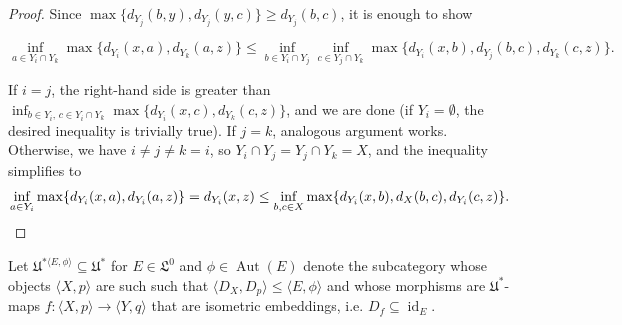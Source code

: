 \documentclass[oneside,notitlepage,12pt]{article}
\theoremstyle{definition}
\theoremstyle{remark}
\newcommand \seq [1]{\langle #1 \rangle}
\newcommand \maps {\colon} %
\newcommand \id [1]{{\operatorname{id}_{#1}}}
\newcommand \Lin {\mathfrak{L}}
\newcommand \Ult {\mathfrak{U}}
\newcommand \Aut {\operatorname{Aut}}
\let \aut \Aut
\begin{document}
\begin{proof}
    Since $\max\{d_{Y_j}(b, y) , d_{Y_j}(y, c)\} \geq d_{Y_j}(b, c)$, it is enough to show
    
     \[
        \inf_{a \in Y_i \cap Y_k} \max\{d_{Y_i}(x, a) , d_{Y_k}(a, z)\}
        \leq
        \inf_{b \in Y_i \cap Y_j} \inf_{c \in Y_j \cap Y_k} \max\{d_{Y_i}(x, b) , d_{Y_j}(b, c) , d_{Y_k}(c, z)\}.
    \]
    
    If $i = j$, the right-hand side is greater than $\inf_{b \in Y_i,\, c \in Y_i \cap Y_k} \max\{d_{Y_i}(x, c) , d_{Y_k}(c, z)\}$, and we are done (if $Y_i = \emptyset$, the desired inequality is trivially true).
    If $j = k$, analogous argument works.
    Otherwise, we have $i \neq j \neq k = i$, so $Y_i \cap Y_j = Y_j \cap Y_k = X$, and the inequality simplifies to
     \[
        \inf_{a \in Y_i} \max\{d_{Y_i}(x, a) , d_{Y_i}(a, z)\}
        = d_{Y_i}(x, z) \leq
        \inf_{b, c \in X} \max\{d_{Y_i}(x, b) , d_{X}(b, c) , d_{Y_i}(c, z)\}.
        \qedhere
    \]
\end{proof}

Let $\Ult^{*\seq{E, \phi}} \subseteq \Ult^*$ for $E \in \Lin^0$ and $\phi \in \aut(E)$ denote the subcategory whose objects $\seq{X, p}$ are such such that $\seq{D_X, D_p} \leq \seq{E, \phi}$ and whose morphisms are $\Ult^*$-maps $f\maps \seq{X, p} \to \seq{Y, q}$ that are isometric embeddings, i.e. $D_f \subseteq \id{E}$.
\end{document}
